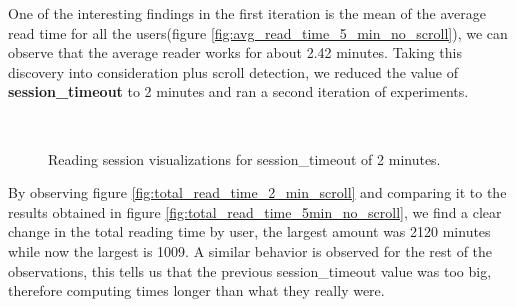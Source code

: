 One of the interesting findings in the first iteration is the mean of the average read time for all the users(figure \ref{fig:avg_read_time_5_min_no_scroll}), we can observe that the average reader works for about 2.42 minutes. Taking this discovery into consideration plus scroll detection, we reduced the value of \textbf{session\_timeout} to 2 minutes and ran a second iteration of experiments.


\begin{figure}[bth]
	\myfloatalign
	 \quad 
	 \\
	 \quad
	\caption{Reading session visualizations for session\_timeout of 2 minutes.}\label{fig:visualizations_2nd_iteration}
\end{figure}

By observing figure \ref{fig:total_read_time_2_min_scroll} and comparing it to the results obtained in figure \ref{fig:total_read_time_5min_no_scroll}, we find a clear change in the total reading time by user, the largest amount was 2120 minutes while now the largest is 1009. A similar behavior is observed for the rest of the observations, this tells us that the previous session\_timeout value was too big, therefore computing times longer than what they really were.

